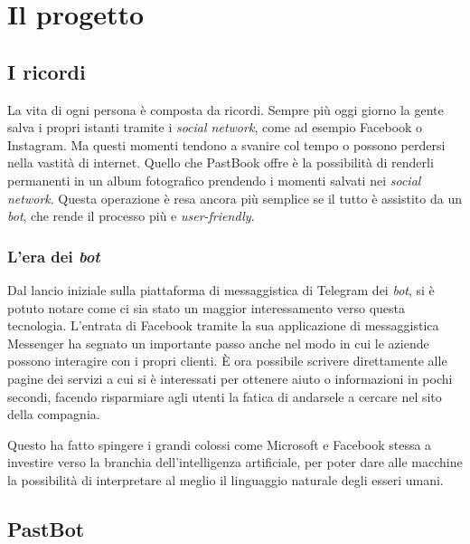 
\chapter{Il progetto}
\label{cap:progetto}

\section{I ricordi}

La vita di ogni persona è composta da ricordi. Sempre più oggi giorno la gente
salva i propri istanti tramite i \textit{social network}, come ad esempio
Facebook o Instagram. Ma questi momenti tendono a svanire col tempo o possono
perdersi nella vastità di internet. Quello che PastBook offre è la
possibilità di renderli permanenti in un album fotografico prendendo i momenti
salvati nei \textit{social network}. Questa operazione è resa ancora più
semplice se il tutto è assistito da un \textit{bot}, che rende il processo più e
\textit{user-friendly}.

\subsection{L'era dei \textit{bot}}

Dal lancio iniziale sulla piattaforma di messaggistica di Telegram dei
\textit{bot}, si è potuto notare come ci sia stato un maggior interessamento
verso questa tecnologia. L'entrata di Facebook tramite la sua applicazione di
messaggistica Messenger ha segnato un importante passo anche nel modo in cui le
aziende possono interagire con i propri clienti. È ora possibile scrivere
direttamente alle pagine dei servizi a cui si è interessati per ottenere aiuto o
informazioni in pochi secondi, facendo risparmiare agli utenti la fatica di
andarsele a cercare nel sito della compagnia.

Questo ha fatto spingere i grandi colossi come Microsoft e Facebook stessa a
investire verso la branchia dell'intelligenza artificiale, per poter dare
alle macchine la possibilità di interpretare al meglio il linguaggio naturale
degli esseri umani.

\section{PastBot}

